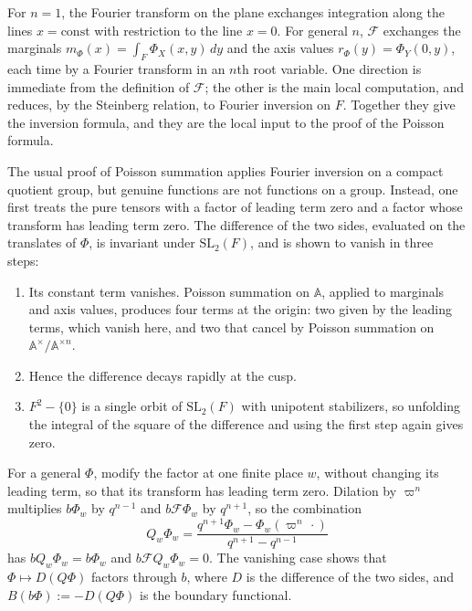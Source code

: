 
\begin{sketch}
  For $n = 1$, the Fourier transform on the plane exchanges integration along the lines $x = \mathrm{const}$ with restriction to the line $x = 0$.  For general $n$, $\mathcal{F}$ exchanges the marginals $m_\Phi(x) = \int_F \Phi_X(x, y) \, d y$ and the axis values $r_\Phi(y) = \Phi_Y(0, y)$, each time by a Fourier transform in an $n$th root variable.  One direction is immediate from the definition of $\mathcal{F}$; the other is the main local computation, and reduces, by the Steinberg relation, to Fourier inversion on $F$.  Together they give the inversion formula, and they are the local input to the proof of the Poisson formula.
\end{sketch}


\begin{sketch}
  The usual proof of Poisson summation applies Fourier inversion on a compact quotient group, but genuine functions are not functions on a group.  Instead, one first treats the pure tensors with a factor of leading term zero and a factor whose transform has leading term zero.  The difference of the two sides, evaluated on the translates of $\Phi$, is invariant under $\mathrm{SL}_2(F)$, and is shown to vanish in three steps:
  \begin{enumerate}
  \item Its constant term vanishes.  Poisson summation on $\mathbb{A}$, applied to marginals and axis values, produces four terms at the origin: two given by the leading terms, which vanish here, and two that cancel by Poisson summation on $\mathbb{A}^\times / \mathbb{A}^{\times n}$.
  \item Hence the difference decays rapidly at the cusp.
  \item $F^2 - \{0\}$ is a single orbit of $\mathrm{SL}_2(F)$ with unipotent stabilizers, so unfolding the integral of the square of the difference and using the first step again gives zero.
  \end{enumerate}
\end{sketch}

\begin{sketch}
  For a general $\Phi$, modify the factor at one finite place $w$, without changing its leading term, so that its transform has leading term zero.  Dilation by $\varpi^n$ multiplies $b \Phi_w$ by $q^{n-1}$ and $b \mathcal{F} \Phi_w$ by $q^{n+1}$, so the combination
  \[
    Q_w \Phi_w = \frac{q^{n+1} \Phi_w - \Phi_w(\varpi^n \, \cdot)}{q^{n+1} - q^{n-1}}
  \]
  has $b Q_w \Phi_w = b \Phi_w$ and $b \mathcal{F} Q_w \Phi_w = 0$.  The vanishing case shows that $\Phi \mapsto D(Q \Phi)$ factors through $b$, where $D$ is the difference of the two sides, and $B(b \Phi) := -D(Q \Phi)$ is the boundary functional.
\end{sketch}
